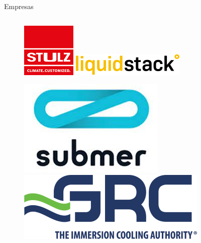 \documentclass[aspectratio=169, compress]{beamer}
\begin{document}
\begin{frame}{Empresas}
\begin{columns}
\begin{column}{0.5\textwidth}
\begin{figure}
\begin{center}
                \end{center}
            \end{figure}
        
            \begin{figure}
                \begin{center}
                    \includegraphics[scale=0.2]{./figures/stulz}
                    \includegraphics[scale=0.2]{./figures/liquidstack}
                \end{center}
            \end{figure}

            \begin{figure}
                \begin{center}
                    \includegraphics[scale=0.2]{./figures/submer}
                    \includegraphics[scale=0.2]{./figures/grc}

                \end{center}
            \end{figure}

        \end{column}
    \end{columns}

\end{frame}
\end{document}
